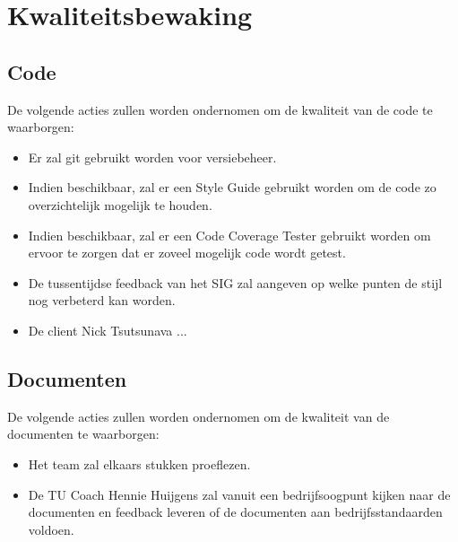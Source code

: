 \section{Kwaliteitsbewaking}
\subsection{Code}
De volgende acties zullen worden ondernomen om de kwaliteit van de code te waarborgen:

\begin{itemize}
	\item Er zal git gebruikt worden voor versiebeheer. 
	\item Indien beschikbaar, zal er een Style Guide gebruikt worden om de code zo overzichtelijk mogelijk te houden.
	\item Indien beschikbaar, zal er een Code Coverage Tester gebruikt worden om ervoor te zorgen dat er zoveel mogelijk code wordt getest. 
	\item De tussentijdse feedback van het SIG zal aangeven op welke punten de stijl nog verbeterd kan worden.
	\item De client Nick Tsutsunava ... %
\end{itemize}

\subsection{Documenten}
De volgende acties zullen worden ondernomen om de kwaliteit van de documenten te waarborgen:
\begin{itemize}
	\item Het team zal elkaars stukken proeflezen.
	\item De TU Coach Hennie Huijgens zal vanuit een bedrijfsoogpunt kijken naar de documenten en feedback leveren of de documenten aan bedrijfsstandaarden voldoen.
\end{itemize}

